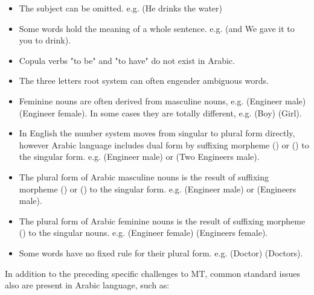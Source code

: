 \begin{itemize}
	\item The subject can be omitted. e.g.  (He drinks the water)
	\item Some words hold the meaning of a whole sentence. e.g.  (and We gave it to you to drink).
	\item Copula verbs "to be" and "to have" do not exist in Arabic.
	\item The three letters root system can often engender ambiguous words.
	\item Feminine nouns are often derived from masculine nouns, e.g.  (Engineer male)  (Engineer female). In some cases they are totally different, e.g.  (Boy)  (Girl).
	\item In English the number system moves from singular to plural form directly, however Arabic language includes dual form by suffixing morpheme () or () to the singular form. e.g.  (Engineer male)  or  (Two Engineers male).
	\item The plural form of Arabic masculine nouns is the result of suffixing morpheme () or () to the singular form.
	e.g.  (Engineer male)  or  (Engineers male).
	\item  The plural form of Arabic feminine nouns is the result of suffixing morpheme () to the singular nouns. e.g.  (Engineer female)  (Engineers female). 
	\item Some words have no fixed rule for their plural form. e.g.  (Doctor)  (Doctors).
\end{itemize}
In addition to the preceding specific challenges to MT, common standard issues also are present in Arabic language, such as:
